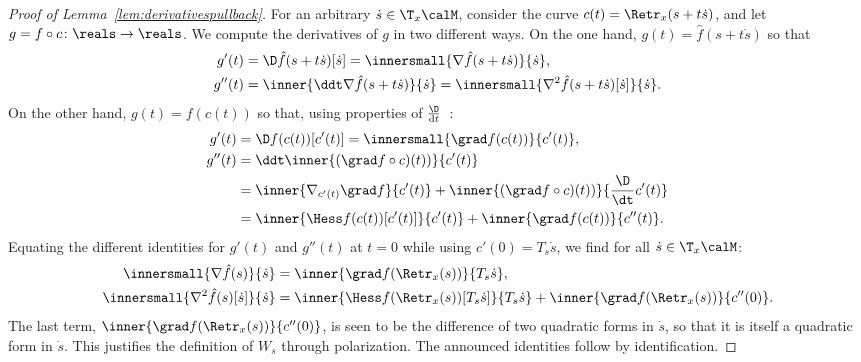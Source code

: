 \begin{proof}[Proof of Lemma~\ref{lem:derivativespullback}]
For an arbitrary $\dot s \in \T_x\calM$, consider the curve $c(t) = \Retr_x(s + t\dot s)$, and let $g = f \circ c \colon \reals \to \reals$. We compute the derivatives of $g$ in two different ways. On the one hand, $g(t) = \hat f(s + t\dot s)$ so that
	\begin{align*}
		g'(t) & = \D\hat f(s+t\dot s)[\dot s] = \innersmall{\nabla \hat f(s+t\dot s)}{\dot s}, \\
		g''(t) & = \inner{ \ddt \nabla \hat f(s+t\dot s)}{\dot s} = \innersmall{\nabla^2 \hat f(s+t\dot s)[\dot s]}{\dot s}.
	\end{align*}
	On the other hand, $g(t) = f(c(t))$ so that, using properties of $\frac{\D}{\mathrm{d}t}$~\cite[pp59--67]{oneill}:
	\begin{align*}
		g'(t)  & = \D f(c(t))[c'(t)] = \innersmall{\grad f(c(t))}{c'(t)}, \\
		g''(t) & = \ddt \inner{(\grad f \circ c)(t))}{c'(t)} \\
		       & = \inner{\nabla_{c'(t)} \grad f}{c'(t)} + \inner{(\grad f \circ c)(t))}{\frac{\D}{\dt} c'(t)} \\
		 	   & = \inner{\Hess f(c(t))[c'(t)]}{c'(t)} + \inner{\grad f(c(t))}{c''(t)}.
	\end{align*}
%	
	Equating the different identities for $g'(t)$ and $g''(t)$ at $t = 0$ while using $c'(0) = T_s \dot s$, we find for all $\dot s \in \T_x\calM$:
	\begin{align*}
		\innersmall{\nabla \hat f(s)}{\dot s} & = \inner{\grad f(\Retr_x(s))}{T_s \dot s}, \\
		\innersmall{\nabla^2 \hat f(s)[\dot s]}{\dot s} & = \inner{\Hess f(\Retr_x(s))[T_s \dot s]}{T_s \dot s} + \inner{\grad f(\Retr_x(s))}{c''(0)}.
	\end{align*}
	The last term, $\inner{\grad f(\Retr_x(s))}{c''(0)}$, is seen to be the difference of two quadratic forms in $\dot s$, so that it is itself a quadratic form in $\dot s$. This justifies the definition of $W_s$ through polarization.
	The announced identities follow by identification.
\end{proof}


